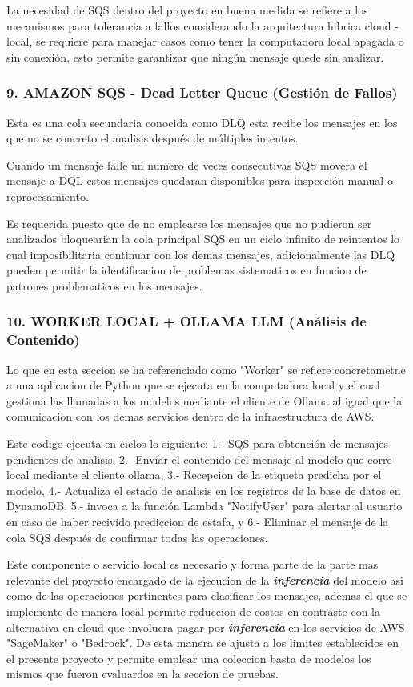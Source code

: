 La necesidad de SQS dentro del proyecto en buena medida se refiere a los mecanismos para tolerancia a fallos considerando la arquitectura hibrica cloud - local, se requiere para manejar casos como tener la computadora local apagada o sin conexión, esto permite garantizar que ningún mensaje quede sin analizar. 

\subsubsection{9. AMAZON SQS - Dead Letter Queue (Gestión de Fallos)}

Esta es una cola secundaria conocida como DLQ esta recibe los mensajes en los que no se concreto el analisis después de múltiples intentos.

Cuando un mensaje falle un numero de veces consecutivas SQS movera el mensaje a DQL estos mensajes quedaran disponibles para inspección manual o reprocesamiento.

Es requerida puesto que de no emplearse los mensajes que no pudieron ser analizados bloquearian la cola principal SQS en un ciclo infinito de reintentos lo cual imposibilitaria continuar con los demas mensajes, adicionalmente las DLQ pueden permitir la identificacion de problemas sistematicos en funcion de patrones problematicos en los mensajes. 

\subsubsection{10. WORKER LOCAL + OLLAMA LLM (Análisis de Contenido)}

Lo que en esta seccion se ha referenciado como "Worker" se refiere concretametne a una aplicacion de Python que se ejecuta en la computadora local y el cual gestiona las llamadas a los modelos mediante el cliente de Ollama al igual que la comunicacion con los demas servicios dentro de la infraestructura de AWS.

Este codigo ejecuta en ciclos lo siguiente: 1.- SQS para obtención de mensajes pendientes de analisis, 2.- Enviar el contenido del mensaje al modelo que corre local mediante el cliente ollama, 3.- Recepcion de la etiqueta predicha por el modelo, 4.- Actualiza el estado de analisis en los registros de la base de datos en DynamoDB, 5.- invoca a la función Lambda "NotifyUser" para alertar al usuario en caso de haber recivido prediccion de estafa, y 6.- Eliminar el mensaje de la cola SQS después de confirmar todas las operaciones.

Este componente o servicio local es necesario y forma parte de la parte mas relevante del proyecto encargado de la ejecucion de la \textbf{\textit{inferencia}} del modelo asi como de las operaciones pertinentes para clasificar los mensajes, ademas el que se implemente de manera local permite reduccion de costos en contraste con la alternativa en cloud que involucra pagar por \textbf{\textit{inferencia}} en los servicios de AWS "SageMaker" o "Bedrock". De esta manera se ajusta a los limites establecidos en el presente proyecto  y permite emplear una coleccion basta de modelos los mismos que fueron evaluardos en la seccion de pruebas. 

